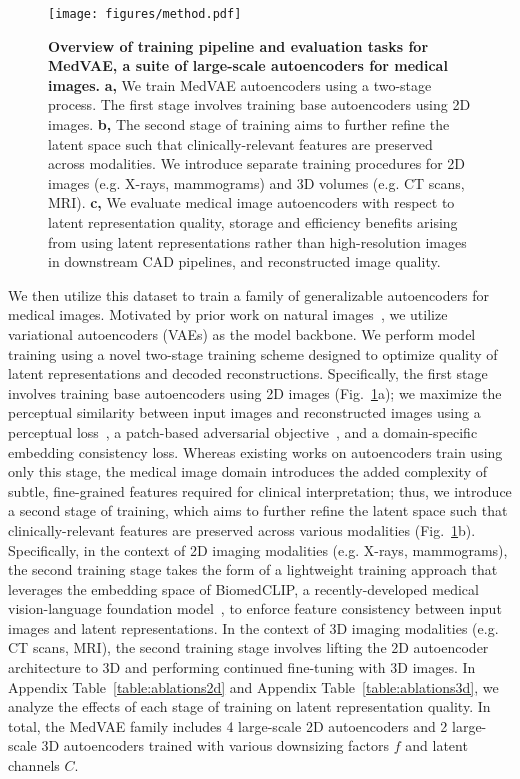 \begin{figure}[ht]
\centering
\texttt{[image: figures/method.pdf]}
\caption{\textbf{Overview of training pipeline and evaluation tasks for MedVAE, a suite of large-scale autoencoders for medical images.} \textbf{a,} We train MedVAE autoencoders using a two-stage process. The first stage involves training base autoencoders using 2D images. \textbf{b,} The second stage of training aims to further refine the latent space such that clinically-relevant features are preserved across modalities. We introduce separate training procedures for 2D images (e.g. X-rays, mammograms) and 3D volumes (e.g. CT scans, MRI). \textbf{c,} We evaluate medical image autoencoders with respect to latent representation quality, storage and efficiency benefits arising from using latent representations rather than high-resolution images in downstream CAD pipelines, and reconstructed image quality.}
\label{fig:method}
\end{figure}


We then utilize this dataset to train a family of generalizable autoencoders for medical images. Motivated by prior work on natural images~\cite{rombach2022high}, we utilize variational autoencoders (VAEs) as the model backbone. We perform model training using a novel two-stage training scheme designed to optimize quality of latent representations and decoded reconstructions. Specifically, the first stage involves training base autoencoders using 2D images (Fig.~\ref{fig:method}a); we maximize the perceptual similarity between input images and reconstructed images using a perceptual loss~\cite{lpips}, a patch-based adversarial objective~\cite{isola2018patchgan}, and a domain-specific embedding consistency loss. Whereas existing works on autoencoders train using only this stage, the medical image domain introduces the added complexity of subtle, fine-grained features required for clinical interpretation; thus, we introduce a second stage of training, which aims to further refine the latent space such that clinically-relevant features are preserved across various modalities (Fig.~\ref{fig:method}b). Specifically, in the context of 2D imaging modalities (e.g. X-rays, mammograms), the second training stage takes the form of a lightweight training approach that leverages the embedding space of BiomedCLIP, a recently-developed medical vision-language foundation model~\cite{zhang2023biomedclip}, to enforce feature consistency between input images and latent representations. In the context of 3D imaging modalities (e.g. CT scans, MRI), the second training stage involves lifting the 2D autoencoder architecture to 3D and performing continued fine-tuning with 3D images. In Appendix Table~\ref{table:ablations2d} and Appendix Table~\ref{table:ablations3d}, we analyze the effects of each stage of training on latent representation quality. In total, the MedVAE family includes 4 large-scale 2D autoencoders and 2 large-scale 3D autoencoders trained with various downsizing factors $f$ and latent channels $C$. 

